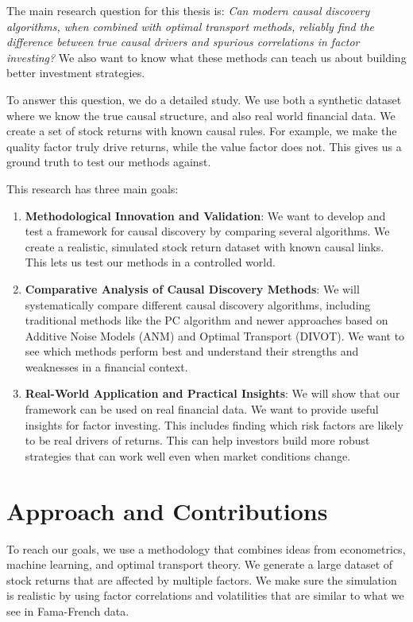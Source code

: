 The main research question for this thesis is: \emph{Can modern causal discovery algorithms, when combined with optimal transport methods, reliably find the difference between true causal drivers and spurious correlations in factor investing?} We also want to know what these methods can teach us about building better investment strategies. 

To answer this question, we do a detailed study. We use both a synthetic dataset where we know the true causal structure, and also real world financial data. We create a set of stock returns with known causal rules. For example, we make the quality factor truly drive returns, while the value factor does not. This gives us a ground truth to test our methods against.

This research has three main goals:

\begin{enumerate}
    \item \textbf{Methodological Innovation and Validation}: We want to develop and test a framework for causal discovery by comparing several algorithms. We create a realistic, simulated stock return dataset with known causal links. This lets us test our methods in a controlled world.
    
    \item \textbf{Comparative Analysis of Causal Discovery Methods}: We will systematically compare different causal discovery algorithms, including traditional methods like the PC algorithm and newer approaches based on Additive Noise Models (ANM) and Optimal Transport (DIVOT). We want to see which methods perform best and understand their strengths and weaknesses in a financial context.
    
    \item \textbf{Real-World Application and Practical Insights}: We will show that our framework can be used on real financial data. We want to provide useful insights for factor investing. This includes finding which risk factors are likely to be real drivers of returns. This can help investors build more robust strategies that can work well even when market conditions change.
\end{enumerate}

\section{Approach and Contributions}

To reach our goals, we use a methodology that combines ideas from econometrics, machine learning, and optimal transport theory. We generate a large dataset of stock returns that are affected by multiple factors. We make sure the simulation is realistic by using factor correlations and volatilities that are similar to what we see in Fama-French data\cite{FamaFrench93}. 

